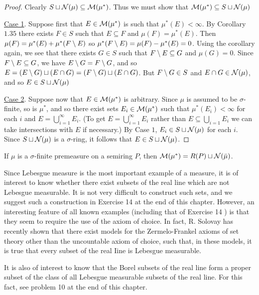 \begin{proof}
Clearly ${S} \sqcup {\cal N}(\mu) \subseteq {\cal M}(\mu^*)$. Thus we must show that ${\cal M}(\mu^*) \subseteq S \sqcup {\cal N}(\mu)$

\underline{Case 1}. Suppose first that $E \in {\cal M}(\mu^*)$ is such that $\mu^*(E)<\infty$. By Corollary $1.35$ there exists $F \in S$ such that $E \subseteq F$ and $\mu(F)=\mu^*(E)$. Then $\mu(F)=\mu^*(E)+\mu^*(F\setminus E)$ so $\mu^*(F\setminus E)=\mu(F)-\mu^*(E)=0$. Using the corollary again, we see that there exists $G \in S$ such that $F\setminus E \subseteq G$ and $\mu(G)=0$. Since $F\setminus E \subseteq G$, we have $E\setminus G=F\setminus G$, and so $E=(E\setminus G) \sqcup(E \cap G)=(F\setminus G) \sqcup(E \cap G)$. But $F\setminus G \in S$ and $E \cap G \in {\cal N}(\mu)$, and so $E \in S \sqcup {\cal N}(\mu)$

\underline{Case 2}. Suppose now that $E \in {\cal M}(\mu^*)$ is arbitrary. Since $\mu$ is assumed to be $\sigma$-finite, so is $\mu^*$, and so there exist sets $E_i \in {\cal M}(\mu^*)$ such that $\mu^*(E_i)<\infty$ for each $i$ and $E=\bigcup_{i=1}^\infty E_i .$ (To get $E=\bigcup_{i=1}^\infty E_i$ rather than $E \subseteq \bigcup_{i=1} E_i$ we can take intersections with $E$ if necessary.) By Case $1$, $E_i \in {S} \sqcup{\cal N}(\mu)$ for each $i$. Since $S \sqcup {\cal N}(\mu)$ is a $\sigma$-ring, it follows that $E \in S \sqcup{\cal N}(\mu)$.
\end{proof}

\begin{corollary}
If $\mu$ is a $\sigma$-finite premeasure on a semiring $P$, then ${\cal M}(\mu^*)=R(P) \sqcup{\cal N}(\bar{\mu})$.
\end{corollary}

Since Lebesgue measure is the most important example of a measure, it is of interest to know whether there exist subsets of the real line which are not Lebesgue measurable. It is not very difficult to construct such sets, and we suggest such a construction in Exercise 14 at the end of this chapter. However, an interesting feature of all known examples (including that of Exercise 14 ) is that they seem to require the use of the axiom of choice. In fact, R. Solovay has recently shown that there exist models for the Zermelo-Frankel axioms of set theory other than the uncountable axiom of choice, such that, in these models, it is true that every subset of the real Iine is Lebesgue measurable.

It is also of interest to know that the Borel subsets of the real line form a proper subset of the class of all Lebesgue measurable subsets of the real line. For this fact, see problem 10 at the end of this chapter.

